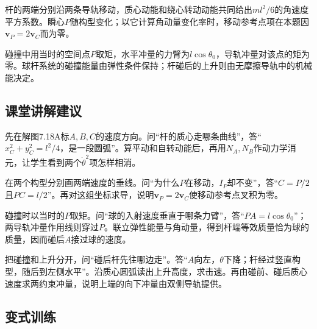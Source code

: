 \documentclass[UTF8,fontset=fandol,a4paper,11pt]{ctexart}
\begin{document}
杆的两端分别沿两条导轨移动，质心动能和绕心转动动能共同给出$ml^2/6$的角速度平方系数。瞬心$P$随构型变化；以它计算角动量变化率时，移动参考点项在本题因$\boldsymbol v_P=2\boldsymbol v_C$而为零。

碰撞中用当时的空间点$P$取矩，水平冲量的力臂为$l\cos\theta_0$，导轨冲量对该点的矩为零。球杆系统的碰撞能量由弹性条件保持；杆碰后的上升则由无摩擦导轨中的机械能决定。




\subsection*{课堂讲解建议}

先在解图7.18A标$A,B,C$的速度方向。问“杆的质心走哪条曲线”，答“$x_C^2+y_C^2=l^2/4$，是一段圆弧”。算平动和自转动能后，再用$N_A,N_B$作动力学消元，让学生看到两个$\dot\theta^2$项怎样相消。

在两个构型分别画两端速度的垂线。问“为什么$P$在移动，$I_P$却不变”，答“$C=P/2$且$PC=l/2$”。再对这组坐标求导，说明$\boldsymbol v_P=2\boldsymbol v_C$使移动参考点叉积为零。

碰撞时以当时的$P$取矩。问“球的入射速度垂直于哪条力臂”，答“$PA=l\cos\theta_0$”；两导轨冲量作用线则穿过$P$。联立弹性能量与角动量，得到杆端等效质量恰为球的质量，因而碰后$A$接过球的速度。

把碰撞和上升分开，问“碰后杆先往哪边走”。答“$A$向左，$\theta$下降；杆经过竖直构型，随后到左侧水平”。沿质心圆弧读出上升高度，求击速。再由碰前、碰后质心速度求两约束冲量，说明上端的向下冲量由双侧导轨提供。




\subsection*{变式训练}
\end{document}
